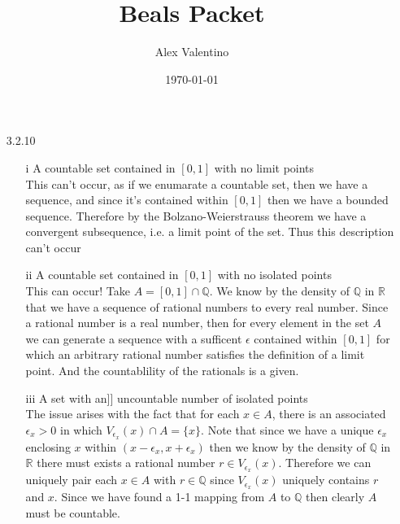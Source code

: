 \documentclass[12pt, letterpaper]{article}
\date{\today}
\author{Alex Valentino}
\title{Beals Packet}
\newcommand{\N}{\mathbb{N}}
\newcommand{\R}{\mathbb{R}}
\newcommand{\Q}{\mathbb{Q}}
\begin{document}
	\begin{enumerate}
		\item[3.2.10]
			\begin{itemize}
				\item[i] A countable set contained in $[0,1]$ with no limit points\\
				This can't occur, as if we enumarate a countable set, then we have
				a sequence, and since it's contained within $[0,1]$ then we have
				a bounded sequence.  Therefore by the Bolzano-Weierstrauss theorem
				we have a convergent subsequence, i.e. a limit point of the set.  
				Thus this description can't occur
				\item[ii]  A countable set contained in $[0,1]$ with no isolated points\\
				This can occur!  Take $A = [0,1] \cap \Q$.  We know by the density of $\Q$ in $\R$ that we have a sequence of rational numbers to every
				real number.  Since a rational number is a real number, then for every element in the set $A$ we can generate a sequence with a sufficent $\epsilon$ contained within $[0,1]$ for which an arbitrary rational number satisfies the definition of a limit point.  And the countablility of the rationals
				is a given.  
				\item[iii] A set with an]] uncountable number of isolated points\\
				
				The issue arises with the fact that for each $x \in A$, there is an associated $\epsilon_x > 0$ in which $V_{\epsilon_x} (x) \cap A = \{x\}$.  Note that since we have a unique $\epsilon_x$ enclosing $x$ within $(x-\epsilon_x,x+\epsilon_x)$ then we know by the density of $\Q$ in $\R$ there
				must exists a rational number $r \in V_{\epsilon_x}(x)$. 
				Therefore we can uniquely pair each $x\in A$ with $r\in \Q$ 
				since $V_{\epsilon_x}(x)$ uniquely contains $r$ and $x$.  
				Since we have found a 1-1 mapping from $A$ to $\Q$ then clearly $A$ must be countable.  
				
				
				

\end{itemize}
\end{enumerate}
\end{document}
